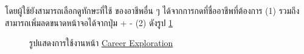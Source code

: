 โดยผู้ใช้ยังสามารถเลือกดูทักษะที่ใช้ ของอาชีพอื่น ๆ ได้จากการกดที่ชื่ออาชีพที่ต้องการ (1) รวมถึงสามารถเพิ่มลดขนาดหน้าจอได้จากปุ่ม + - (2) ดังรูป \ref{fig:home-CE}
\begin{figure}[H]\centering
    \caption{รูปแสดงการใช้งานหน้า \hyperref[subsec:Career Exploration]{Career Exploration}}\label{fig:home-CE}
\end{figure}
